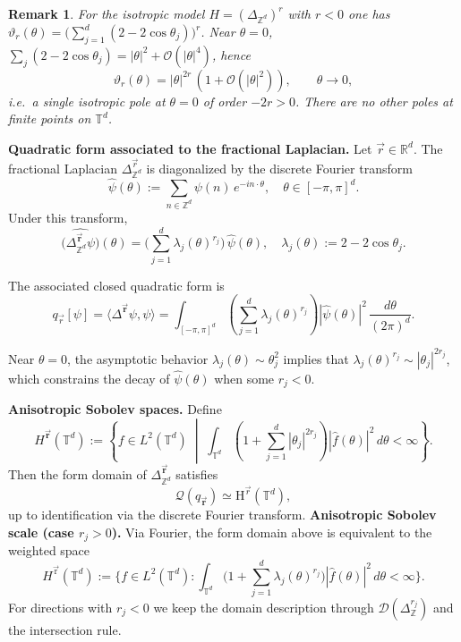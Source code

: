 \documentclass[10pt]{amsart} %
\newcommand{\T}{{\mathbb{T}}}
\newcommand{\Z}{{\mathbb{Z}}}
\newcommand{\1}{{\mathbb{I}}}
\newcommand{\Dc}{\mathcal{D}}
\numberwithin{equation}{section}
\newtheorem{remark}[theorem]{Remark}%
\begin{document}
\begin{remark}
For the isotropic model $H=(\Delta_{\mathbb{Z}^d})^{r}$ with $r<0$ one has
$\vartheta_r(\theta)=\bigl(\sum_{j=1}^d(2-2\cos \theta_j)\bigr)^{r}$.
Near $\theta=0$, $\sum_{j}(2-2\cos \theta_j)=|\theta|^2+\mathcal{O}(|\theta|^4)$, hence
\[
\vartheta_r(\theta)=|\theta|^{2r}\,(1+\mathcal{O}(|\theta|^2)),\qquad \theta\to0,
\]
i.e.\ a \emph{single isotropic pole} at $\theta=0$ of order $-2r>0$.
There are no other poles at finite points on $\mathbb{T}^d$.
\end{remark}

\noindent\textbf{Quadratic form associated to the fractional Laplacian.} Let \(\vec{r} \in \mathbb{R}^d\). The fractional Laplacian \(\Delta^{\vec{r}}_{\mathbb{Z}^d}\) is diagonalized by the discrete Fourier transform
\[
\hat{\psi}(\theta) := \sum_{n \in \mathbb{Z}^d} \psi(n)\, e^{-i n\cdot \theta}, \quad \theta \in [-\pi, \pi]^d.
\]
Under this transform,
\[
\widehat{\big(\Delta_{\mathbb{Z}^d}^{\vec{\mathbf{r}}}\psi\big)}(\theta)
= \Big(\sum_{j=1}^d \lambda_j(\theta)^{r_j}\Big)\,\hat{\psi}(\theta),
\quad \lambda_j(\theta) := 2 - 2\cos \theta_j.
\]

The associated closed quadratic form is
\[
q_{\vec{r}}[\psi] = \langle \Delta^{\vec{\mathbf{r}}} \psi, \psi \rangle = \int_{[-\pi,\pi]^d} \left( \sum_{j=1}^d \lambda_j(\theta)^{r_j} \right) |\hat{\psi}(\theta)|^2\, \frac{d\theta}{(2\pi)^d}.
\]

Near \(\theta=0\), the asymptotic behavior \(\lambda_j(\theta) \sim \theta_j^2\) implies that \(\lambda_j(\theta)^{r_j} \sim |\theta_j|^{2r_j}\), which constrains the decay of \(\hat{\psi}(\theta)\) when some \(r_j < 0\).

\noindent\textbf{Anisotropic Sobolev spaces.} Define
\[
H^{\vec{\mathbf{r}}}(\mathbb{T}^d)
:= \left\{ f \in L^2(\mathbb{T}^d) \;\middle|\; \int_{\mathbb{T}^d} \left( 1 + \sum_{j=1}^d |\theta_j|^{2r_j} \right) |\hat{f}(\theta)|^2\,d\theta < \infty \right\}.
\]
Then the form domain of \(\Delta_{\mathbb{Z}^d}^{\vec{\mathbf{r}}}\) satisfies
\[
\mathcal{Q}(q_{\vec{\mathbf{r}}}) \simeq \mathrm{H}^{\vec{r}}(\mathbb{T}^d),
\]
up to identification via the discrete Fourier transform.
\noindent\textbf{Anisotropic Sobolev scale (case $r_j>0$).}
Via Fourier, the form domain above is equivalent to the weighted space
\[
H^{\vec{\mathrm{r}}}(\T^d)
:=\Big\{f\in L^2(\T^d): \int_{\T^d}\Big(1+\sum_{j=1}^d \lambda_j(\theta)^{r_j}\Big)|\hat f(\theta)|^2\,d\theta<\infty\Big\}.
\]
For directions with $r_j<0$ we keep the domain description through $\Dc(\Delta_{\Z}^{r_j})$ and the intersection rule.
\end{document}
